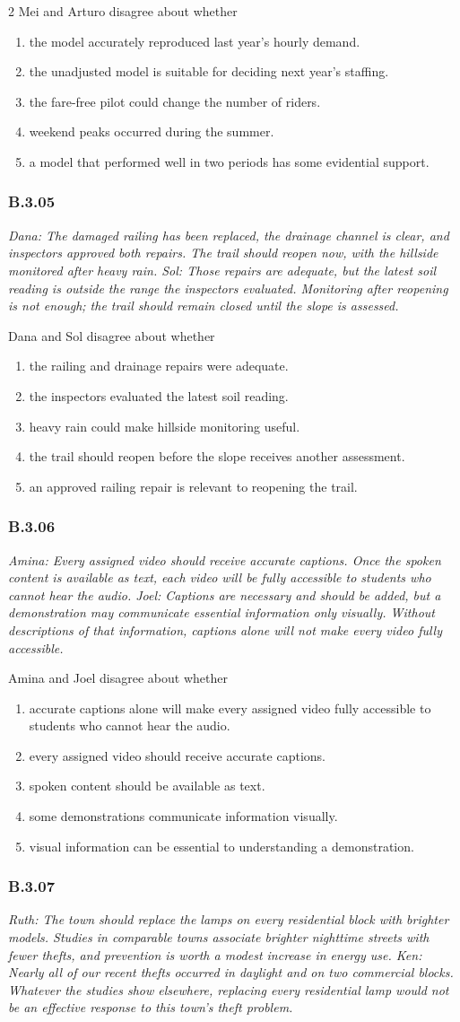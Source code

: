 \documentclass[10pt]{extarticle}
\newcommand{\choice}[1]{\item #1}
\newcommand{\bankitem}[1]{\subsubsection*{#1}}
\begin{document}
\begin{multicols}{2}
Mei and Arturo disagree about whether
\begin{enumerate}[label=(\alph*)]
  \choice{the model accurately reproduced last year's hourly demand.}
  \choice{the unadjusted model is suitable for deciding next year's staffing.}
  \choice{the fare-free pilot could change the number of riders.}
  \choice{weekend peaks occurred during the summer.}
  \choice{a model that performed well in two periods has some evidential support.}
\end{enumerate}
\bankitem{B.3.05}
\emph{Dana: The damaged railing has been replaced, the drainage channel is clear, and inspectors approved both repairs. The trail should reopen now, with the hillside monitored after heavy rain. Sol: Those repairs are adequate, but the latest soil reading is outside the range the inspectors evaluated. Monitoring after reopening is not enough; the trail should remain closed until the slope is assessed.}

Dana and Sol disagree about whether
\begin{enumerate}[label=(\alph*)]
  \choice{the railing and drainage repairs were adequate.}
  \choice{the inspectors evaluated the latest soil reading.}
  \choice{heavy rain could make hillside monitoring useful.}
  \choice{the trail should reopen before the slope receives another assessment.}
  \choice{an approved railing repair is relevant to reopening the trail.}
\end{enumerate}
\bankitem{B.3.06}
\emph{Amina: Every assigned video should receive accurate captions. Once the spoken content is available as text, each video will be fully accessible to students who cannot hear the audio. Joel: Captions are necessary and should be added, but a demonstration may communicate essential information only visually. Without descriptions of that information, captions alone will not make every video fully accessible.}

Amina and Joel disagree about whether
\begin{enumerate}[label=(\alph*)]
  \choice{accurate captions alone will make every assigned video fully accessible to students who cannot hear the audio.}
  \choice{every assigned video should receive accurate captions.}
  \choice{spoken content should be available as text.}
  \choice{some demonstrations communicate information visually.}
  \choice{visual information can be essential to understanding a demonstration.}
\end{enumerate}
\bankitem{B.3.07}
\emph{Ruth: The town should replace the lamps on every residential block with brighter models. Studies in comparable towns associate brighter nighttime streets with fewer thefts, and prevention is worth a modest increase in energy use. Ken: Nearly all of our recent thefts occurred in daylight and on two commercial blocks. Whatever the studies show elsewhere, replacing every residential lamp would not be an effective response to this town's theft problem.}


\end{multicols}
\end{document}
